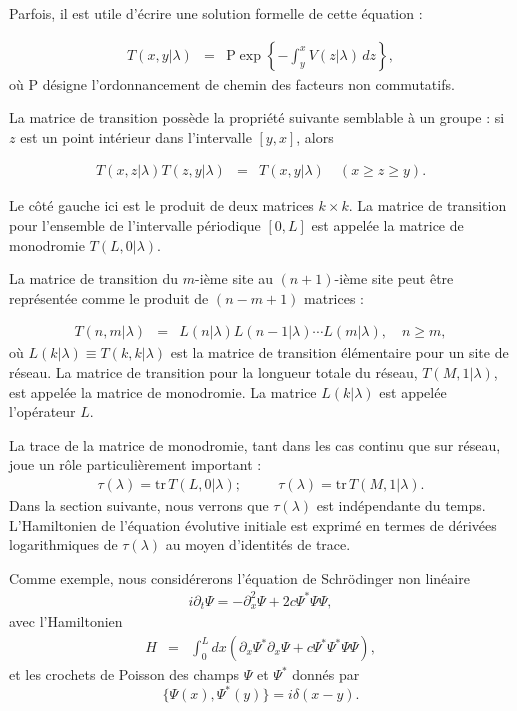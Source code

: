 Parfois, il est utile d'écrire une solution formelle de cette équation :

\begin{eqnarray}
    T(x, y|\lambda) &=& \text{P} \exp \left\{ -\int_y^x V(z|\lambda) \, dz \right\}, \label{eq.1.7}
\end{eqnarray}
où \( \text{P} \) désigne l'ordonnancement de chemin des facteurs non commutatifs.

La matrice de transition possède la propriété suivante semblable à un groupe : si \( z \) est un point intérieur dans l'intervalle \( [y, x] \), alors

\begin{eqnarray*}
    T(x, z|\lambda) T(z, y|\lambda) & = & T(x, y|\lambda) \quad (x \geq z \geq y).
\end{eqnarray*}

Le côté gauche ici est le produit de deux matrices \( k \times k \). La matrice de transition pour l'ensemble de l'intervalle périodique \([0, L]\) est appelée la matrice de monodromie \( T(L, 0|\lambda) \).

La matrice de transition du \( m \)-ième site au \( (n + 1) \)-ième site peut être représentée comme le produit de \( (n - m + 1) \) matrices :

\begin{eqnarray}
    T(n, m|\lambda) & = & L(n|\lambda) L(n - 1|\lambda) \cdots L(m|\lambda), \quad n \geq m,
\end{eqnarray}
où \( L(k|\lambda) \equiv T(k, k|\lambda) \) est la matrice de transition élémentaire pour un site de réseau. La matrice de transition pour la longueur totale du réseau, \( T(M, 1|\lambda) \), est appelée la matrice de monodromie. La matrice \( L(k|\lambda) \) est appelée l'opérateur \( L \).


La trace de la matrice de monodromie, tant dans les cas continu que sur réseau, joue un rôle particulièrement important :
\begin{eqnarray}
    \tau(\lambda) =  \mathrm{tr} \, T(L, 0|\lambda);&& \quad \tau(\lambda) = \mathrm{tr} \, T(M, 1|\lambda).
\end{eqnarray}
Dans la section suivante, nous verrons que \(  \tau(\lambda)  \) est indépendante du temps. L'Hamiltonien de l'équation évolutive initiale est exprimé en termes de dérivées logarithmiques de \(  \tau(\lambda)  \) au moyen d'identités de trace.

Comme exemple, nous considérerons l'équation de Schrödinger non linéaire
\begin{eqnarray}
    i\partial_t \Psi = - \partial_x^2 \Psi + 2c \Psi^\ast \Psi \Psi,
\end{eqnarray}
avec l'Hamiltonien
\begin{eqnarray}
    H  & = &  \int_0^L dx \left( \partial_x \Psi^\ast \partial_x \Psi + c \Psi^\ast \Psi^\ast \Psi \Psi \right),
\end{eqnarray}
et les crochets de Poisson des champs \( \Psi \) et \( \Psi^* \) donnés par
\begin{equation}
    \{ \Psi(x), \Psi^*(y) \} = i\delta(x - y).
\end{equation}

